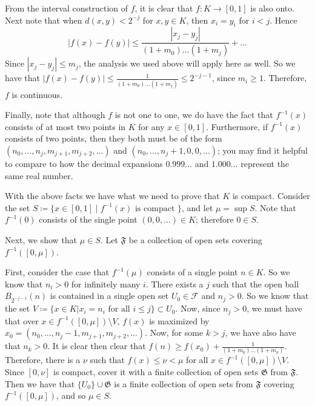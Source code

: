 From the interval construction of \(f\), it is clear that \(f: K \to [0, 1]\) is also onto. Next note that
when \(d(x, y) < 2^{-j}\) for \(x,y \in K\), then \(x_i = y_i\) for \(i < j\). Hence
\begin{equation}
|f(x) - f(y)| \leq \frac{|x_j - y_j|}{(1 + m_0)...(1 + m_j)} + ...
\end{equation} 
Since \(|x_j - y_j| \leq m_j\), the analysis we used above will apply here as well. So we have that
\(|f(x) - f(y)| \leq \frac{1}{(1 + m_0)...(1 + m_j)} \leq 2^{-j-1}\), since \(m_i \geq 1\). Therefore,
\(f\) is continuous.

Finally, note that although \(f\) is not one to one, we do have the fact that \(f^{-1}(x)\) consists of at most
two points in \(K\) for any \(x \in [0, 1]\). Furthermore, if \(f^{-1}(x)\) consists of two points, then
they both must be of the form \\
\((n_0, ..., n_j, m_{j+1}, m_{j+2}, ...)\) and \((n_0, ..., n_j + 1, 0, 0, ...)\);
you may find it helpful to compare to how the decimal expansions \(0.999...\) and \(1.000...\)
represent the same real number.

With the above facts we have what we need to prove that \(K\) is compact. Consider the set
\(S \coloneqq \{x \in [0, 1] \mid f^{-1}(x) \text{ is compact }\}\), and let \(\mu = \sup S\). Note that
\(f^{-1}(0)\) consists of the single point \((0,0,...)\in K\); therefore \(0 \in S\). 

Next, we show that \(\mu \in S\). Let \(\mathfrak F\) be a collection of open sets covering \(f^{-1}([0, \mu])\).

First, consider the case that \(f^{-1}(\mu)\) consists of a single point \(n \in K\). So we know that
\(n_i > 0\) for infinitely many \(i\). There exists a \(j\) such that the open ball \(B_{2^{-j-1}}(n)\) is
contained in a single open set \(U_0 \in \mathcal F\) and \(n_j > 0\). So we know that the set 
\(V \coloneqq \{x \in K | x_i = n_i \text{ for all } i\leq j\} \subset U_0\). Now, since \(n_j > 0\), we
must have that over \(x \in f^{-1}([0, \mu]) \setminus V\), \(f(x)\) is maximized by 
\(x_0 = (n_0, ..., n_j - 1, m_{j+1}, m_{j+2}, ...)\). Now, for some \(k > j\), we have also have that \(n_k > 0\).
It is clear then clear that \(f(n) \geq f(x_0) + \frac{1}{(1+m_0)...(1+m_k)}\). Therefore, there is a
\(\nu\) such that \(f(x) \leq \nu < \mu\) for all \(x \in f^{-1}([0, \mu]) \setminus V\).
Since \([0, \nu]\) is compact, cover it with a
finite collection of open sets \(\mathfrak G\) from \(\mathfrak F\). Then we have that
\(\{U_0\} \cup \mathfrak G\) is a finite collection of open sets from \(\mathfrak F\) covering
\(f^{-1}([0, \mu])\), and so \(\mu \in S\). 

